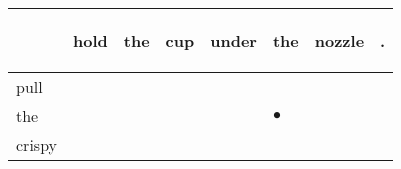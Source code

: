 \documentclass[landscape]{article}
\newcommand{\ssp}{\hspace{2pt}}
\newcommand{\mex}{\cellcolor{g}$\bullet$}
\begin{document}
\noindent\begin{tabular}{|l|p{10pt}|p{10pt}|p{10pt}|p{10pt}|p{10pt}|p{10pt}|p{10pt}|}
\hline
&\begin{sideways}\cellcolor{ref0}hold\hspace{12pt}\end{sideways}&\begin{sideways}\cellcolor{ref1}the\hspace{12pt}\end{sideways}&\begin{sideways}\cellcolor{ref2}cup\hspace{12pt}\end{sideways}&\begin{sideways}\cellcolor{ref3}under\hspace{12pt}\end{sideways}&\begin{sideways}\cellcolor{ref4}the\hspace{12pt}\end{sideways}&\begin{sideways}\cellcolor{ref5}nozzle\hspace{12pt}\end{sideways}&\begin{sideways}\cellcolor{ref6}.\hspace{12pt}\end{sideways}\\
\hline
\ssp pull \ssp&\hspace{2pt}&\hspace{2pt}&\hspace{2pt}&\hspace{2pt}&\hspace{2pt}&\hspace{2pt}&\hspace{2pt}\\
\hline
\ssp \cellcolor{ref4}the \ssp&\hspace{2pt}&\hspace{2pt}&\hspace{2pt}&\hspace{2pt}&\hspace{2pt}\mex&\hspace{2pt}&\hspace{2pt}\\
\hline
\ssp crispy \ssp&\hspace{2pt}&\hspace{2pt}&\hspace{2pt}&\hspace{2pt}&\hspace{2pt}&\hspace{2pt}&\hspace{2pt}\\

\end{tabular}
\end{document}
